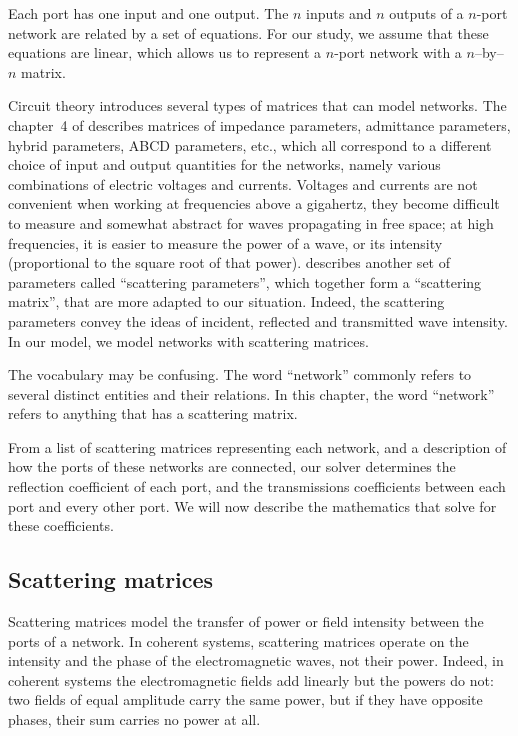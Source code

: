 Each port has one input and one output.
The $n$ inputs and $n$ outputs of a $n$-port network are related by a set of equations.
For our study, we assume that these equations are linear,
which allows us to represent a $n$-port network with a $n$--by--$n$ matrix.

Circuit theory introduces several types of matrices that can model networks.
The chapter~4 of \textcite{pozar2009microwave} describes matrices of impedance parameters, admittance parameters, hybrid parameters, ABCD parameters, etc., which all correspond to a different choice of input and output quantities for the networks, namely various combinations of electric voltages and currents.
Voltages and currents are not convenient when working at frequencies above a gigahertz, they become difficult to measure and somewhat abstract for waves propagating in free space;
at high frequencies, it is easier to measure the power of a wave, or its intensity (proportional to the square root of that power).
\textcite{pozar2009microwave} describes another set of parameters called ``scattering parameters'', which together form a ``scattering matrix'', that are more adapted to our situation.
Indeed, the scattering parameters convey the ideas of incident, reflected and transmitted wave intensity.
In our model, we model networks with scattering matrices.

The vocabulary may be confusing.
The word ``network'' commonly refers to several distinct entities and their relations.
In this chapter, the word ``network'' refers to anything that has a scattering matrix.


From a list of scattering matrices representing each network, and a description of how the ports of these networks are connected, our solver determines the reflection coefficient of each port, and the transmissions coefficients between each port and every other port.
We will now describe the mathematics that solve for these coefficients.






\subsection{Scattering matrices}

Scattering matrices \parencite{pozar2009microwave,siegman1986lasers} model the transfer of power or field intensity between the ports of a network.
In coherent systems, scattering matrices operate on the intensity and the phase of the electromagnetic waves, not their power.
Indeed, in coherent systems the electromagnetic fields add linearly but the powers do not: two fields of equal amplitude carry the same power, but if they have opposite phases, their sum carries no power at all.

